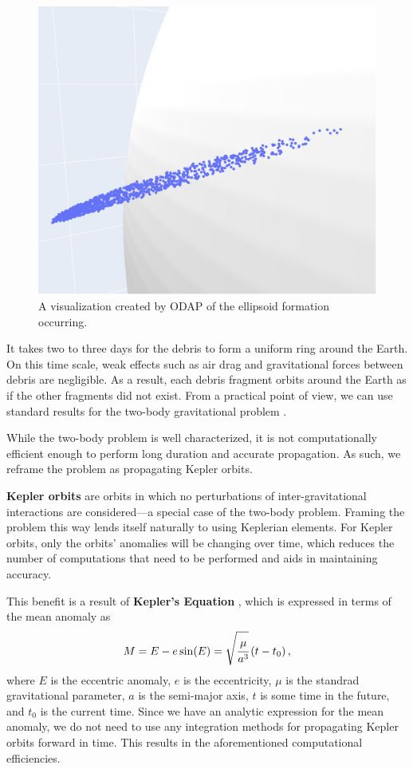 \documentclass[a4paper, 12pt]{article}
\newcommand{\lindex}[1]{%
	\lowercase{\def\temp{#1}}%
	\expandafter\index\expandafter{\temp}%
}
\newcommand{\boldindex}[1]{%
	\textbf{#1}\lindex{#1}%
}
\begin{document}
\begin{figure}[h]
	\centering
	\includegraphics[scale=0.35]{ellisoid_phase}
	\caption{A visualization created by ODAP of the ellipsoid formation occurring.}
	\label{fig:ellipsoid}
\end{figure}

It takes two to three days for the debris to form a uniform ring around the Earth. On this time scale, weak effects such as air drag and gravitational forces between debris are negligible. As a result, each debris fragment orbits around the Earth as if the other fragments did not exist. From a practical point of view, we can use standard results for the two-body gravitational problem \citep{vallado_d._2013}.

While the two-body problem is well characterized, it is not computationally efficient enough to perform long duration and accurate propagation. As such, we reframe the problem as propagating Kepler orbits.

\boldindex{Kepler orbits} are orbits in which no perturbations of inter-gravitational interactions are considered---a special case of the two-body problem. Framing the problem this way lends itself naturally to using Keplerian elements. For Kepler orbits, only the orbits' anomalies will be changing over time, which reduces the number of computations that need to be performed and aids in maintaining accuracy.

This benefit is a result of \boldindex{Kepler's Equation}, which is expressed in terms of the mean anomaly as
\begin{equation}
	M = E - e\sin(E) = \sqrt{\cfrac{\mu}{a^3}}\left(t - t_0\right),
\end{equation}
where $E$ is the eccentric anomaly, $e$ is the eccentricity, $\mu$ is the standrad gravitational parameter, $a$ is the semi-major axis, $t$ is some time in the future, and $t_0$ is the current time. Since we have an analytic expression for the mean anomaly, we do not need to use any integration methods for propagating Kepler orbits forward in time. This results in the aforementioned computational efficiencies.
\end{document}
